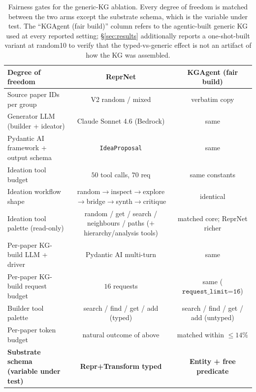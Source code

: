 \documentclass[10pt,twocolumn]{article}
\begin{document}
\begin{table}[t]
\centering
\small
\setlength{\tabcolsep}{4pt}
\begin{tabular}{lcc}
\toprule
Degree of freedom                                  & ReprNet                       & KGAgent (fair build)         \\
\midrule
Source paper IDs per group                         & V2 random / mixed             & verbatim copy                \\
Generator LLM (builder + ideator)                  & Claude Sonnet 4.6 (Bedrock)   & same                         \\
Pydantic AI framework + output schema              & \texttt{IdeaProposal}         & same                         \\
Ideation tool budget                               & $50$ tool calls, $70$ req     & same constants               \\
Ideation workflow shape                            & random$\to$inspect$\to$explore$\to$bridge$\to$synth$\to$critique & identical \\
Ideation tool palette (read-only)                  & random / get / search / neighbours / paths ($+$ hierarchy/analysis tools) & matched core; ReprNet richer \\
Per-paper KG-build LLM + driver                    & Pydantic AI multi-turn        & same                         \\
Per-paper KG-build request budget                  & $16$ requests                 & same ($\texttt{request\_limit=16}$) \\
Builder tool palette                               & search / find / get / add (typed) & search / find / get / add (untyped) \\
Per-paper token budget                             & natural outcome of above      & matched within $\leq 14\%$   \\
\midrule
\textbf{Substrate schema (variable under test)}    & \textbf{Repr+Transform typed} & \textbf{Entity + free predicate} \\
\bottomrule
\end{tabular}
\caption{Fairness gates for the generic-KG ablation.  Every
degree of freedom is matched between the two arms except the
substrate schema, which is the variable under test.  The
``KGAgent (fair build)'' column refers to the agentic-built
generic KG used at every reported setting; \S\ref{sec:results}
additionally reports a one-shot-built variant at random10 to
verify that the typed-vs-generic effect is not an artifact of
how the KG was assembled.}
\label{tab:kg-fairness-gates}
\end{table}
\end{document}
